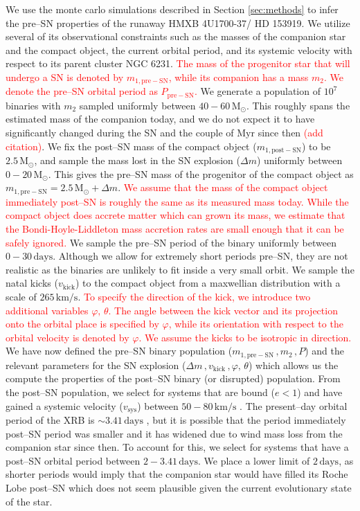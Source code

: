 \documentclass[linenumbers,trackchanges,twocolumn]{aastex701}
\newcommand{\Mdot}{\mathrm{M}_{\odot}}
\newcommand{\red}{\textcolor{red}}
\begin{document}
We use the monte carlo simulations described in Section \ref{sec:methods} to infer the pre--SN properties of the runaway HMXB 4U1700-37/ HD 153919. We utilize several of its observational constraints such as the masses of the companion star and the compact object, the current orbital period, and its systemic velocity with respect to its parent cluster NGC 6231. \red{The mass of the progenitor star that will undergo a SN is denoted by $m_{1,\mathrm{pre-SN}}$, while its companion has a mass $m_2$. We denote the pre--SN orbital period as $P_{\mathrm{pre-SN}}$.} We generate a population of $10^7$ binaries with $m_2$ sampled uniformly between $40-60\,\Mdot$. This roughly spans the estimated mass of the companion today, and we do not expect it to have significantly changed during the SN and the couple of $\mathrm{Myr}$ since then \red{(add citation)}. We fix the post--SN mass of the compact object ($m_{1,\mathrm{post-SN}}$) to be $2.5 \, \Mdot$, and sample the mass lost in the SN explosion ($\Delta m$) uniformly between $0-20 \, \Mdot$. This gives the pre--SN mass of the progenitor of the compact object as $m_{1,\mathrm{pre-SN}} = 2.5\, \Mdot + \Delta m$. \red{We assume that the mass of the compact object immediately post--SN is roughly the same as its measured mass today. While the compact object does accrete matter which can grown its mass, we estimate that the Bondi-Hoyle-Liddleton mass accretion rates are small enough that it can be safely ignored.} We sample the pre--SN period of the binary uniformly between $0-30\, \mathrm{days}$. Although we allow for extremely short periods pre--SN, they are not realistic as the binaries are unlikely to fit inside a very small orbit. We sample the natal kicks ($v_{\mathrm{kick}}$) to the compact object from a maxwellian distribution with a scale of $265 \, \mathrm{km/s}$. \red{To specify the direction of the kick, we introduce two additional variables $\varphi,\, \theta$. The angle between the kick vector and its projection onto the orbital place is specified by $\varphi$, while its orientation with respect to the orbital velocity is denoted by $\varphi$. We assume the kicks to be isotropic in direction.} We have now defined the pre--SN binary population ($m_{1,\mathrm{pre-SN}}\,, m_2\,, P$) and the relevant parameters for the SN explosion ($\Delta m\,, v_{\mathrm{kick}}\,, \varphi,\, \theta$) which allows us the compute the properties of the post--SN binary (or disrupted) population. From the post--SN population, we select for systems that are bound ($e<1$) and have gained a systemic velocity ($v_{\mathrm{sys}}$) between $50-80 \, \mathrm{km/s}$ \citep{2021A&A...655A..31V}. The present--day orbital period of the XRB is $ \sim 3.41 \, \mathrm{days}$ \citep{2016MNRAS.461..816I}, but it is possible that the period immediately post--SN period was smaller and it has widened due to wind mass loss from the companion star since then. To account for this, we select for systems that have a post--SN orbital period between $2-3.41 \, \mathrm{days}$. We place a lower limit of $2 \, \mathrm{days}$, as shorter periods would imply that the companion star would have filled its Roche Lobe post--SN which does not seem plausible given the current evolutionary state of the star. 
\end{document}
